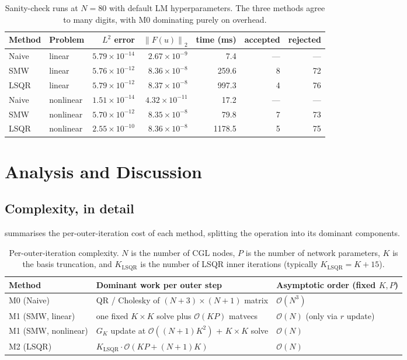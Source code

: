 \documentclass[11pt,a4paper]{article}
\newcommand{\norm}[1]{\left\lVert #1 \right\rVert}
\newcommand{\Order}{\mathcal{O}}
\newcommand{\GK}{G_{K}}
\begin{document}
\begin{table}[h]
\centering
\caption{Sanity-check runs at $N=80$ with default LM hyperparameters. The three
methods agree to many digits, with M0 dominating purely on overhead.}
\label{tab:sanity}
\begin{tabular}{l l r r r r r}
\toprule
Method & Problem & $L^{2}$ error & $\norm{F(u)}_{2}$ & time (ms) & accepted & rejected\\
\midrule
Naive  & linear    & $5.79\times10^{-14}$ & $2.67\times10^{-9}$ &    7.4 & --- & --- \\
SMW    & linear    & $5.76\times10^{-12}$ & $8.36\times10^{-8}$ &  259.6 &   8 &  72 \\
LSQR   & linear    & $5.79\times10^{-12}$ & $8.37\times10^{-8}$ &  997.3 &   4 &  76 \\
\midrule
Naive  & nonlinear & $1.51\times10^{-14}$ & $4.32\times10^{-11}$&   17.2 & --- & --- \\
SMW    & nonlinear & $5.70\times10^{-12}$ & $8.35\times10^{-8}$ &   79.8 &   7 &  73 \\
LSQR   & nonlinear & $2.55\times10^{-10}$ & $8.36\times10^{-8}$ & 1178.5 &   5 &  75 \\
\bottomrule
\end{tabular}
\end{table}

\section{Analysis and Discussion}
\label{sec:analysis}

\subsection{Complexity, in detail}

 summarises the per-outer-iteration cost of each method,
splitting the operation into its dominant components.

\begin{table}[h]
\centering
\caption{Per-outer-iteration complexity. $N$ is the number of CGL nodes,
$P$ is the number of network parameters, $K$ is the basis truncation,
and $K_{\mathrm{LSQR}}$ is the number of LSQR inner iterations
(typically $K_{\mathrm{LSQR}} = K + 15$).}
\label{tab:complexity}
\small
\begin{tabular}{l l l}
\toprule
Method & Dominant work per outer step & Asymptotic order (fixed $K,P$) \\
\midrule
M0 (Naive)          & QR / Cholesky of $(N{+}3){\times}(N{+}1)$ matrix             & $\Order(N^{3})$ \\
M1 (SMW, linear)    & one fixed $K{\times}K$ solve plus $\Order(KP)$ matvecs       & $\Order(N)$ (only via $r$ update) \\
M1 (SMW, nonlinear) & $\GK$ update at $\Order((N{+}1)K^{2})$ + $K{\times}K$ solve  & $\Order(N)$ \\
M2 (LSQR)           & $K_{\mathrm{LSQR}}\cdot \Order(KP + (N{+}1)K)$               & $\Order(N)$ \\
\bottomrule
\end{tabular}
\end{table}
\end{document}
